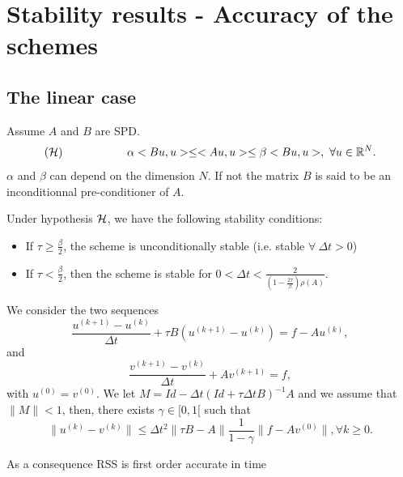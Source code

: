 \documentclass[hyperref={pdfpagemode=FullScreen},9pt]{beamer}
\newcommand{\Frac}[2] {\frac{\textstyle #1} {\textstyle #2}}
\begin{document}
\section{Stability results - Accuracy of the schemes}
\subsection{The linear case}
\begin{frame}
Assume $A$ and $B$ are SPD. 
$$
({\cal H})\hskip 2.cm  \alpha <Bu,u>\le <Au,u> \le \beta <Bu,u>, \ \forall u \in {\mathbb R}^N.
$$
$\alpha$ and $\beta$ can depend on the dimension $N$. If not the matrix $B$ is said to be an inconditionnal pre-conditioner of $A$.
\pause
\begin{theorem}
Under hypothesis ${\cal H}$, we have the following stability conditions:
\begin{itemize}
\item If $\tau\ge \Frac{\beta}{2}$, the scheme is unconditionally stable (i.e. stable $\forall \ \Delta t >0$)
\item If $\tau < \Frac{\beta}{2}$, then the scheme is stable for
$
0<\Delta t < \Frac{2}{\left(1-\Frac{2\tau}{\beta}\right)\rho(A)}.
$
\end{itemize} 
\label{RSS_Stab_lin}
\end{theorem}
\end{frame}
%
\begin{frame}
\begin{theorem}\label{RSSPrec}
We consider the two sequences
$$
 \Frac{u^{(k+1)}-u^{(k)}}{\Delta t} +\tau B (u^{(k+1)}-u^{(k)}) =f-Au^{(k)},
 $$
and
$$
 \Frac{v^{(k+1)}-v^{(k)}}{\Delta t} +A v^{(k+1)} =f,
 $$
 with $u^{(0)}=v^{(0)}$. We let $M=Id-\Delta t(Id+\tau \Delta t B)^{-1}A$ and we assume that $\parallel M\parallel < 1$,
 then,  there exists $\gamma \in [0,1[$ such that
 $$
\parallel u^{(k)}- v^{(k)}\parallel \le  \Delta t^2 \parallel  \tau B-A\parallel \Frac{1}{1-\gamma}\parallel  f-Av^{(0)} \parallel  , \forall k \ge 0.
$$
\end{theorem}
As a consequence RSS is first order accurate in time
\end{frame}
%
\end{document}
